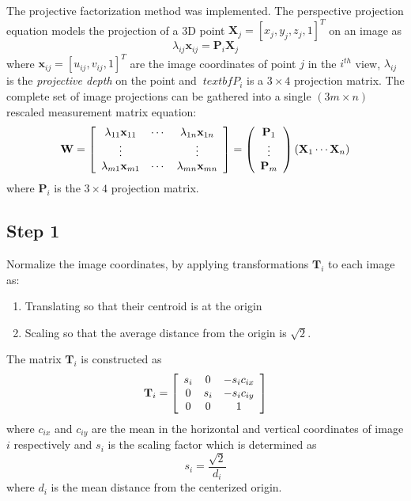 The projective factorization method \cite{Triggs} was implemented. 
The perspective projection equation models the projection of a 3D point $ \textbf{X}_j = [x_j, y_j, z_j, 1]^T $ on an image as
$$ \lambda_{ij} \textbf{x}_{ij} = \textbf{P}_i \textbf{X}_j $$
where $ \textbf{x}_{ij} = [ u_{ij}, v_{ij}, 1]^T $ are the image coordinates of point $ j $ in the $i^{th}$ view, $ \lambda_{ij} $ is the \textit{projective depth} on the point and $ \ textbf{P}_i $ is a $ 3 \times 4 $ projection matrix. 
The complete set of image projections can be gathered into a single $ (3m \times n ) $ rescaled measurement matrix equation:
\begin{equation}
\textbf{W} = 
\left[ \begin{array}{c c c }
\lambda_{11} \textbf{x}_{11} & \cdots & \lambda_{1n} \textbf{x}_{1n} \\
\vdots & & \vdots \\
\lambda_{m1} \textbf{x}_{m1} & \cdots & \lambda_{mn} \textbf{x}_{mn} 
\end{array} \right]
= 
\left( \begin{array}{c}
\textbf{P}_1 \\
\vdots \\
\textbf{P}_m \\
\end{array} \right)
( \textbf{X}_1 \cdots \textbf{X}_n )
\end{equation}
where $ \textbf{P}_i $ is the $ 3 \times 4 $ projection matrix. 

\subsection{Step 1}

Normalize the image coordinates, by applying transformations $ \textbf{T}_i $ to each image as:
\begin{enumerate}
\item Translating so that their centroid is at the origin
\item Scaling so that the average distance from the origin is $ \sqrt{2}. $
\end{enumerate}
The matrix $ \textbf{T}_i $ is constructed as
\begin{equation}
\textbf{T}_i = 
\left[ \begin{array}{c c c }
s_i & 0  & -s_i c_{ix} \\
0 & s_i & -s_i c_{iy} \\
0 & 0 & 1 
\end{array} \right]
\end{equation}
where $ c_{ix} $ and $ c_{iy} $ are the mean in the horizontal and vertical coordinates of image $ i $ respectively and $ s_i $ is the scaling factor which is determined as
$$ s_i = \frac{\sqrt{2}}{ d_i} $$
where $ d_i $ is the mean distance from the centerized origin.   


